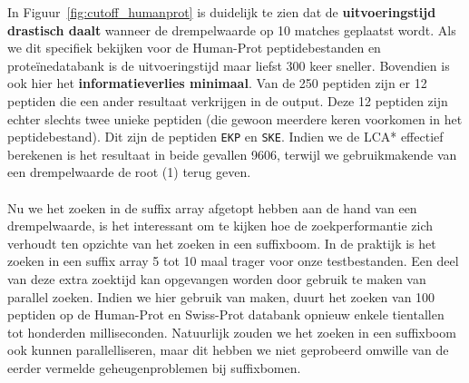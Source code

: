 In Figuur~\ref{fig:cutoff_humanprot} is duidelijk te zien dat de \textbf{uitvoeringstijd drastisch daalt} wanneer de drempelwaarde op 10 matches geplaatst wordt.
Als we dit specifiek bekijken voor de Human-Prot peptidebestanden en proteïnedatabank is de uitvoeringstijd maar liefst 300 keer sneller.
Bovendien is ook hier het \textbf{informatieverlies minimaal}.
Van de 250 peptiden zijn er 12 peptiden die een ander resultaat verkrijgen in de output.
Deze 12 peptiden zijn echter slechts twee unieke peptiden (die gewoon meerdere keren voorkomen in het peptidebestand).
Dit zijn de peptiden \texttt{EKP} en \texttt{SKE}.
Indien we de LCA* effectief berekenen is het resultaat in beide gevallen 9606, terwijl we gebruikmakende van een drempelwaarde de root (1) terug geven.
\\ \\
Nu we het zoeken in de suffix array afgetopt hebben aan de hand van een drempelwaarde, is het interessant om te kijken hoe de zoekperformantie zich verhoudt ten opzichte van het zoeken in een suffixboom.
In de praktijk is het zoeken in een suffix array 5 tot 10 maal trager voor onze testbestanden.
Een deel van deze extra zoektijd kan opgevangen worden door gebruik te maken van parallel zoeken.
Indien we hier gebruik van maken, duurt het zoeken van 100 peptiden op de Human-Prot en Swiss-Prot databank opnieuw enkele tientallen tot honderden milliseconden.
Natuurlijk zouden we het zoeken in een suffixboom ook kunnen parallelliseren, maar dit hebben we niet geprobeerd omwille van de eerder vermelde geheugenproblemen bij suffixbomen.

